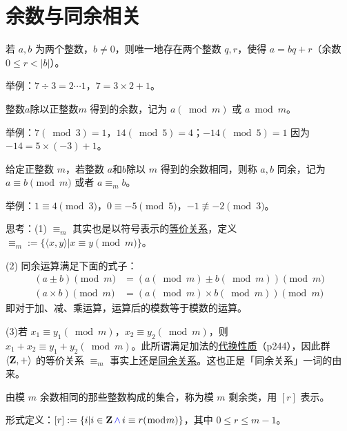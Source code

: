 \documentclass[UTF8]{ctexart}
\newcommand\Concept[1]{\colorbox{cyan!10!white}{\textcolor{cyan!40!black}{#1}}}
\newcommand\Notes[1]{\textcolor{yellow!50!black}{\small #1}}
\newcommand\Example[1]{\textcolor{cyan!70!black}{\small #1}}
\newcommand\relation[2]{\langle #1,#2 \rangle}
\newcommand\pos[1]{\hspace{0pt} \marginpar{\footnotesize\ttfamily\textcolor{yellow!50!black}{\hfill #1}}}
\newcommand\otherconcept[1]{\textcolor{green!40!black}{\underline{#1}}}
\newcommand\h{\text{\textcolor{blue}{\,$\wedge$\,}}} %
\newcommand\defines{:=}
\newcommand\Z{\text{\textbf{Z}}}
\begin{document}
\section{余数与同余相关}
\begin{description}[itemsep=0pt, parsep=0pt]
    \item[\Concept{带余数除法}] \pos{p186} 若 $a,b$ 为两个整数，$b\ne 0$，则唯一地存在两个整数 $q,r$，使得 $a=bq+r$（余数 $0\leqslant r < |b|$）。

    \Example{举例：$7\div 3=2\cdots 1$，$7 = 3\times 2 + 1$。}

    \item[\Concept{余数}] \pos{p192} 整数$a$除以正整数$m$ 得到的余数，记为 $a(\bmod m)$ 或 $a\bmod m$。

    \Example{举例：$7(\bmod 3)=1$，$14(\bmod 5)=4$；$-14(\bmod 5)=1$ 因为 $-14=5\times (-3)+1$。}

    \item[\Concept{同余}] \pos{p192} 给定正整数 $m$，若整数 $a$和$b$除以 $m$ 得到的余数相同，则称 $a,b$ 同余，记为 $a\equiv b\pmod m$ 或者 $a\equiv_m b$。

    \Example{举例：$1\equiv 4\pmod 3$，$0\equiv -5\pmod 5$，$-1\not\equiv -2\pmod 3$。}

    \Notes{思考：(1) \otherconcept{$\equiv_m$} 其实也是以符号表示的\otherconcept{等价关系}，定义 $\equiv_m \defines \{\relation{x}{y} | x\equiv y\pmod m\}$。}

    \Notes{(2) 同余运算满足下面的式子：
    \begin{equation*}
    \begin{aligned}
        (a\pm b)\pmod m &= (a(\bmod m) \pm b(\bmod m))\pmod m \\
        (a\times b)\pmod m &= (a(\bmod m) \times b(\bmod m))\pmod m
    \end{aligned}
    \end{equation*}
    即对于加、减、乘运算，运算后的模数等于模数的运算。}

    \Notes{(3)若 $x_1\equiv y_1(\bmod m)$，$x_2\equiv y_2(\bmod m)$，则 $x_1+x_2\equiv y_1+y_2 (\bmod m)$。此所谓满足加法的\otherconcept{代换性质}（p244），因此群 $\relation{\Z}{+}$ 的等价关系 $\equiv_m$ 事实上还是\otherconcept{同余关系}。这也正是「同余关系」一词的由来。}

    \item[\Concept{模 $m$ 剩余类}] \pos{p195} 由模 $m$ 余数相同的那些整数构成的集合，称为模 $m$ 剩余类，用 $[r]$ 表示。

    \Notes{形式定义：$[r] \defines \{ i |i\in\Z \h i\equiv r(\bmod m)\}$，其中 $0\leqslant r\leqslant m-1$。}


\end{description}
\end{document}
